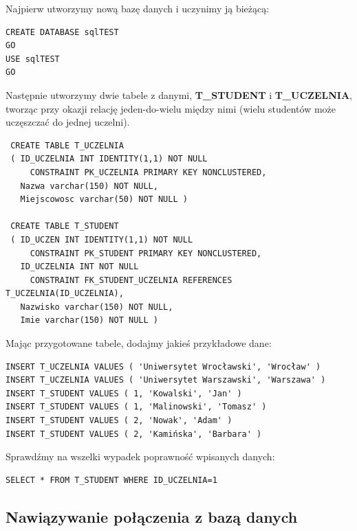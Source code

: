 Najpierw utworzymy nową bazę danych i uczynimy ją bieżącą:

\begin{scriptsize}
\begin{verbatim}
CREATE DATABASE sqlTEST
GO
USE sqlTEST
GO
\end{verbatim}
\end{scriptsize}

Następnie utworzymy dwie tabele z danymi, {\bf T\_STUDENT} i {\bf T\_UCZELNIA}, tworząc przy okazji
relację jeden-do-wielu między nimi (wielu studentów może uczęszczać do jednej uczelni).

\begin{scriptsize}
\begin{verbatim}
 CREATE TABLE T_UCZELNIA
 ( ID_UCZELNIA INT IDENTITY(1,1) NOT NULL
     CONSTRAINT PK_UCZELNIA PRIMARY KEY NONCLUSTERED,
   Nazwa varchar(150) NOT NULL,
   Miejscowosc varchar(50) NOT NULL )

 CREATE TABLE T_STUDENT
 ( ID_UCZEN INT IDENTITY(1,1) NOT NULL
     CONSTRAINT PK_STUDENT PRIMARY KEY NONCLUSTERED,
   ID_UCZELNIA INT NOT NULL
     CONSTRAINT FK_STUDENT_UCZELNIA REFERENCES T_UCZELNIA(ID_UCZELNIA),
   Nazwisko varchar(150) NOT NULL,
   Imie varchar(150) NOT NULL )
\end{verbatim}
\end{scriptsize}

Mając przygotowane tabele, dodajmy jakieś przykładowe dane:
\begin{scriptsize}
\begin{verbatim}
INSERT T_UCZELNIA VALUES ( 'Uniwersytet Wrocławski', 'Wrocław' )
INSERT T_UCZELNIA VALUES ( 'Uniwersytet Warszawski', 'Warszawa' )
INSERT T_STUDENT VALUES ( 1, 'Kowalski', 'Jan' )
INSERT T_STUDENT VALUES ( 1, 'Malinowski', 'Tomasz' )
INSERT T_STUDENT VALUES ( 2, 'Nowak', 'Adam' )
INSERT T_STUDENT VALUES ( 2, 'Kamińska', 'Barbara' )
\end{verbatim}
\end{scriptsize}

Sprawdźmy na wszelki wypadek poprawność wpisanych danych:
\begin{scriptsize}
\begin{verbatim}
SELECT * FROM T_STUDENT WHERE ID_UCZELNIA=1
\end{verbatim}
\end{scriptsize}

\subsection{Nawiązywanie połączenia z bazą danych}

